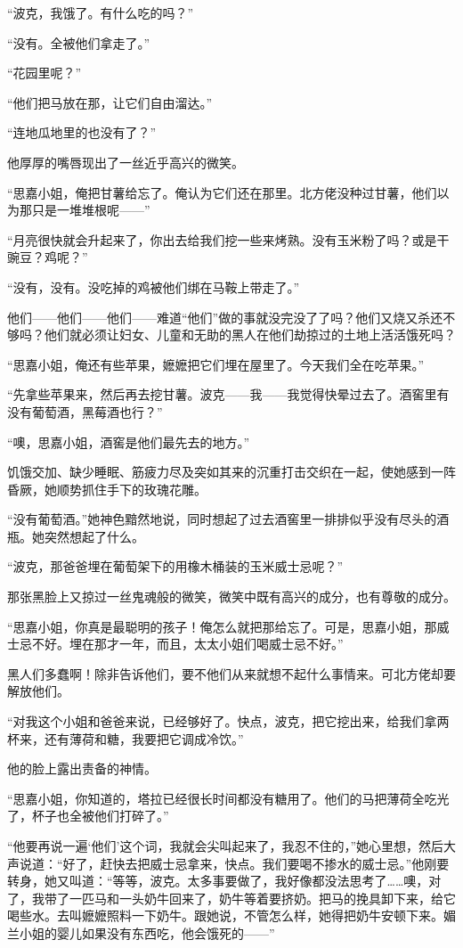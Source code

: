 \par “波克，我饿了。有什么吃的吗？”
\par “没有。全被他们拿走了。”
\par “花园里呢？”
\par “他们把马放在那，让它们自由溜达。”
\par “连地瓜地里的也没有了？”
\par 他厚厚的嘴唇现出了一丝近乎高兴的微笑。
\par “思嘉小姐，俺把甘薯给忘了。俺认为它们还在那里。北方佬没种过甘薯，他们以为那只是一堆堆根呢——”
\par “月亮很快就会升起来了，你出去给我们挖一些来烤熟。没有玉米粉了吗？或是干豌豆？鸡呢？”
\par “没有，没有。没吃掉的鸡被他们绑在马鞍上带走了。”
\par 他们——他们——他们——难道“他们”做的事就没完没了了吗？他们又烧又杀还不够吗？他们就必须让妇女、儿童和无助的黑人在他们劫掠过的土地上活活饿死吗？
\par “思嘉小姐，俺还有些苹果，嬷嬷把它们埋在屋里了。今天我们全在吃苹果。”
\par “先拿些苹果来，然后再去挖甘薯。波克——我——我觉得快晕过去了。酒窖里有没有葡萄酒，黑莓酒也行？”
\par “噢，思嘉小姐，酒窖是他们最先去的地方。”
\par 饥饿交加、缺少睡眠、筋疲力尽及突如其来的沉重打击交织在一起，使她感到一阵昏厥，她顺势抓住手下的玫瑰花雕。
\par “没有葡萄酒。”她神色黯然地说，同时想起了过去酒窖里一排排似乎没有尽头的酒瓶。她突然想起了什么。
\par “波克，那爸爸埋在葡萄架下的用橡木桶装的玉米威士忌呢？”
\par 那张黑脸上又掠过一丝鬼魂般的微笑，微笑中既有高兴的成分，也有尊敬的成分。
\par “思嘉小姐，你真是最聪明的孩子！俺怎么就把那给忘了。可是，思嘉小姐，那威士忌不好。埋在那才一年，而且，太太小姐们喝威士忌不好。”
\par 黑人们多蠢啊！除非告诉他们，要不他们从来就想不起什么事情来。可北方佬却要解放他们。
\par “对我这个小姐和爸爸来说，已经够好了。快点，波克，把它挖出来，给我们拿两杯来，还有薄荷和糖，我要把它调成冷饮。”
\par 他的脸上露出责备的神情。
\par “思嘉小姐，你知道的，塔拉已经很长时间都没有糖用了。他们的马把薄荷全吃光了，杯子也全被他们打碎了。”
\par “他要再说一遍‘他们’这个词，我就会尖叫起来了，我忍不住的，”她心里想，然后大声说道：“好了，赶快去把威士忌拿来，快点。我们要喝不掺水的威士忌。”他刚要转身，她又叫道：“等等，波克。太多事要做了，我好像都没法思考了……噢，对了，我带了一匹马和一头奶牛回来了，奶牛等着要挤奶。把马的挽具卸下来，给它喝些水。去叫嬷嬷照料一下奶牛。跟她说，不管怎么样，她得把奶牛安顿下来。媚兰小姐的婴儿如果没有东西吃，他会饿死的——”

